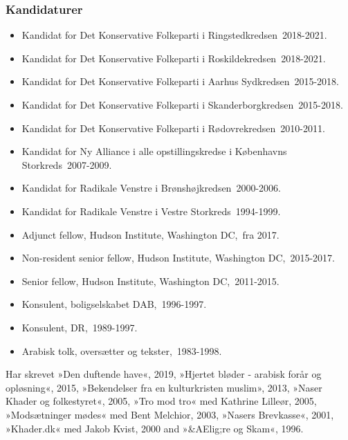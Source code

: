 \documentclass[11pt, a4paper]{awesome-cv}
\begin{document}
\begin{cvletter}
\subsubsection*{Kandidaturer}
\begin{itemize}
\item Kandidat for Det Konservative Folkeparti i Ringstedkredsen 2018-2021.
\item Kandidat for Det Konservative Folkeparti i Roskildekredsen 2018-2021.
\item Kandidat for Det Konservative Folkeparti i Aarhus Sydkredsen 2015-2018.
\item Kandidat for Det Konservative Folkeparti i Skanderborgkredsen 2015-2018.
\item Kandidat for Det Konservative Folkeparti i Rødovrekredsen 2010-2011.
\item Kandidat for Ny Alliance i alle opstillingskredse i Københavns Storkreds 2007-2009.
\item Kandidat for Radikale Venstre i Brønshøjkredsen 2000-2006.
\item Kandidat for Radikale Venstre i Vestre Storkreds 1994-1999.
\end{itemize}
\begin{itemize}
\item Adjunct fellow, Hudson Institute, Washington DC, fra 2017.
\item Non-resident senior fellow, Hudson Institute, Washington DC, 2015-2017.
\item Senior fellow, Hudson Institute, Washington DC, 2011-2015.
\item Konsulent, boligselskabet DAB, 1996-1997.
\item Konsulent, DR, 1989-1997.
\item Arabisk tolk, oversætter og tekster, 1983-1998.
\end{itemize}
Har skrevet »Den duftende have«, 2019, »Hjertet bløder - arabisk forår og opløsning«, 2015, »Bekendelser fra en kulturkristen muslim», 2013, »Naser Khader og folkestyret«, 2005, »Tro mod tro« med Kathrine Lilleør, 2005, »Modsætninger mødes« med Bent Melchior, 2003, »Nasers Brevkasse«, 2001, »Khader.dk« med Jakob Kvist, 2000 and »&AElig;re og Skam«, 1996.  

\end{cvletter}
\end{document}
